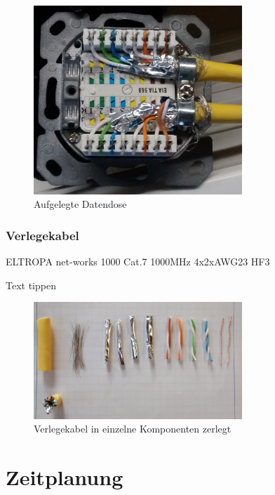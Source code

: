 \documentclass[
a4paper,     %
 headsepline, %
11pt         %
]{scrartcl}  %
\begin{document}
\begin{figure}[htbp] 
	\centering
	\includegraphics[width=0.7\textwidth]{anschlussdose.jpg}
	\caption{Aufgelegte Datendose}
	\label{fig:Dose1}
\end{figure}

\subsubsection{Verlegekabel}
ELTROPA net-works 1000 Cat.7 1000MHz 4x2xAWG23 HF3

Text tippen
\begin{figure}[htbp] 
	\centering
	\includegraphics[width=0.7\textwidth]{verlegekabel.jpg}
	\caption{Verlegekabel in einzelne Komponenten zerlegt}
	\label{fig:Kabel1}
\end{figure}


\section{Zeitplanung}
\end{document}
